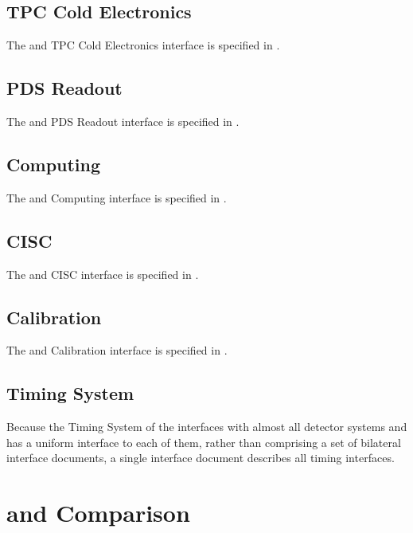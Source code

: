 
\subsection{TPC Cold Electronics}
The  and TPC Cold Electronics interface is specified in \cite{docid-6742}.
\subsection{PDS Readout}
The  and PDS Readout interface is specified in \cite{docid-6727}.
\subsection{Computing}
The  and Computing interface is specified in \cite{docid-7123}.
\subsection{CISC}
\label{sec:sp-daq:interfaces-cisc}
The  and CISC interface is specified in \cite{docid-6790}.
\subsection{Calibration}
The  and Calibration interface is specified in \cite{docid-7069}.
\subsection{Timing System}
Because the Timing System of the   interfaces with
almost all detector systems and has a uniform interface to each of
them, rather than comprising a set of 
bilateral interface documents, a single interface document
\cite{docid-11224} describes all timing interfaces. 

\section{ and  Comparison}


